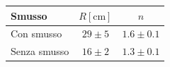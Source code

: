 \begin{table}[H]
    \centering
    \small
    \begin{tabular}{l c c}
        \toprule
        Smusso & $R [\si{\centi\metre}]$ & $n$ \\
        \midrule
		Con smusso & $29 \pm 5$ & $1.6 \pm 0.1$  \\
		Senza smusso & $16 \pm 2$ & $1.3 \pm 0.1$ \\
        \bottomrule
    \end{tabular}
\end{table}







